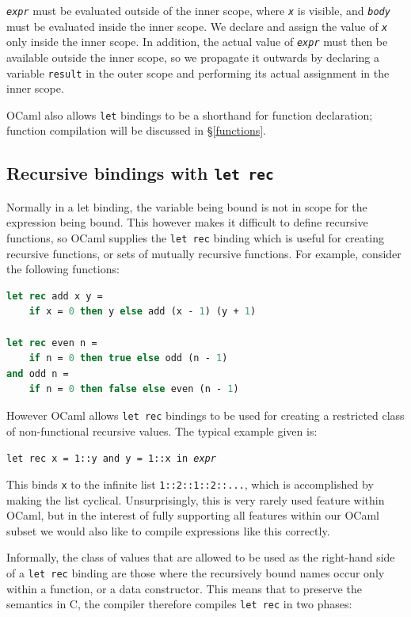 \documentclass[12pt,a4paper,twoside,openright]{report}
\begin{document}
\texttt{\emph{expr}} must be evaluated outside of the inner scope, where
\texttt{\emph{x}} is visible, and \texttt{\emph{body}} must be evaluated inside
the inner scope. We declare and assign the value of \texttt{\emph{x}} only
inside the inner scope. In addition, the actual value of \texttt{\emph{expr}}
must then be available outside the inner scope, so we propagate it outwards by
declaring a variable \texttt{result} in the outer scope and performing its
actual assignment in the inner scope.

OCaml also allows \texttt{let} bindings to be a shorthand for function
declaration; function compilation will be discussed in \S\ref{functions}.

\subsection{Recursive bindings with \texttt{let rec}}

Normally in a let binding, the variable being bound is not in scope for the
expression being bound. This however makes it difficult to define recursive
functions, so OCaml supplies the \texttt{let rec} binding which is useful for
creating recursive functions, or sets of mutually recursive functions. For
example, consider the following functions:

\begin{lstlisting}[language=Caml]
let rec add x y =
    if x = 0 then y else add (x - 1) (y + 1)

let rec even n =
    if n = 0 then true else odd (n - 1)
and odd n =
    if n = 0 then false else even (n - 1)
\end{lstlisting}

However OCaml allows \texttt{let rec} bindings to be used for creating a
restricted class of non-functional recursive values. The typical example given
is:

\begin{center}
    \texttt{let rec x = 1::y and y = 1::x in \emph{expr}}
\end{center}

This binds \texttt{x} to the infinite list \texttt{1::2::1::2::...}, which is
accomplished by making the list cyclical. Unsurprisingly, this is very rarely
used feature within OCaml, but in the interest of fully supporting all features
within our OCaml subset we would also like to compile expressions like this
correctly.

Informally, the class of values that are allowed to be used as the right-hand
side of a \texttt{let rec} binding are those where the recursively bound names
occur only within a function, or a data constructor. This means that to preserve
the semantics in C, the compiler therefore compiles \texttt{let rec} in two
phases:
\end{document}
